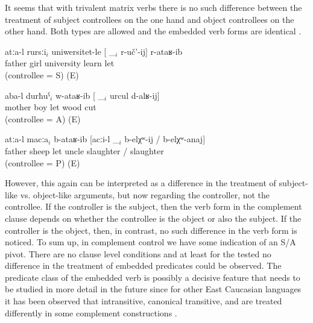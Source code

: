 It seems that with trivalent matrix verbs there is no such difference between the treatment of subject controllees on the one hand and object controllees on the other hand. Both types are allowed and the embedded verb forms are identical . 
%
\begin{exe}
	
		\ex	\label{ex:Father sent the daughter to the university to study@47a}
		\gll	atːa-l	rursːi$_{i}$	uniwersitet-le	[ \_$_{i}$	r-uč'-ij]	r-ataʁ-ib\\
			father	girl	university	{} 	\tsc{f-}learn	let\\
		\glt	{} (controllee = S) (E)

		\ex	\label{ex:Mother sent the son to cut firewood@47b}
		\gll	aba-l	durħuˁ$_{i}$	w-ataʁ-ib	[ \_$_{i}$	urcul	d-alʁ-ij]\\
			mother	boy	let	{}  	wood	cut\\
		\glt	{} (controllee = A) (E)

		\ex	\label{ex:Father sent the sheep in order to be slaughtered by the uncle@47c}
		\gll	atːa-l	macːa$_{i}$	b-ataʁ-ib	[acːi-l	\_$_{i}$	b-elχʷ-ij	/	b-elχʷ-anaj]\\
			father	sheep	let	uncle		slaughter	/ slaughter\\
		\glt	{} (controllee = P) (E)
	
\end{exe}

However, this again can be interpreted as a difference in the treatment of subject-like vs. object-like arguments, but now regarding the controller, not the controllee. If the controller is the subject, then the verb form in the complement clause depends on whether the controllee is the object or also the subject. If the controller is the object, then, in contrast, no such difference in the verb form is noticed. To sum up, in complement control we have some indication of an S/A pivot. There are no clause level conditions and at least for the tested  no difference in the treatment of embedded predicates could be observed. The predicate class of the embedded verb is possibly a decisive feature that needs to be studied in more detail in the future since for other East Caucasian languages it has been observed that intransitive, canonical transitive, and  are treated differently in some complement constructions  \citep{Kibrik2003}.

